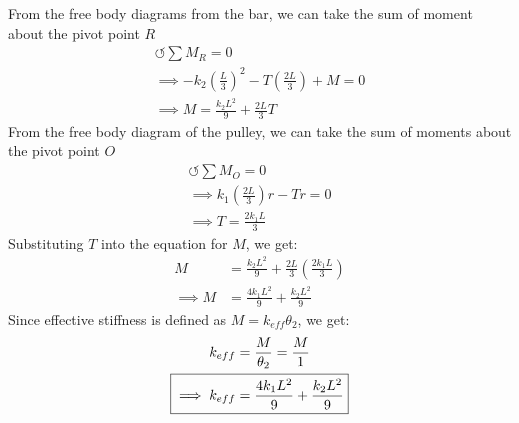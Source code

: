 From the free body diagrams from the bar, we can take the sum of moment about the pivot point $R$
\begin{gather*}
    \circlearrowleft \sum M_R = 0 \\
    \implies -k_2 \left(\frac{L}{3}\right)^2 - T \left(\frac{2L}{3}\right) + M = 0 \\
    \implies M = \frac{k_2 L^2}{9} + \frac{2L}{3} T 
\end{gather*}
From the free body diagram of the pulley, we can take the sum of moments about the pivot point $O$
\begin{gather*}
    \circlearrowleft \sum M_O = 0 \\
    \implies k_1 \left(\frac{2L}{3}\right)r - T r = 0 \\
    \implies T = \frac{2 k_1 L}{3}
\end{gather*}
Substituting $T$ into the equation for $M$, we get:
\begin{align*}
    M &= \frac{k_2 L^2}{9} + \frac{2L}{3} \left(\frac{2 k_1 L}{3}\right) \\
    \implies M &= \frac{4 k_1 L^2}{9} + \frac{k_2 L^2}{9}
\end{align*}
Since effective stiffness is defined as $M = k_{eff} \theta_2$, we get:
\begin{align*}
    k_{eff} &= \frac{M}{\theta_2} = \frac{M}{1} \\
    \Aboxed{\implies k_{eff} &= \frac{4 k_1 L^2}{9} + \frac{k_2 L^2}{9}}
\end{align*}


